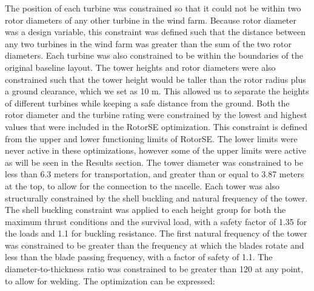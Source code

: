         The position of each turbine was constrained so that it could not be within two rotor diameters of any other turbine in the wind farm. Because rotor diameter was a design variable, this constraint was defined such that the distance between any two turbines in the wind farm was greater than the sum of the two rotor diameters.
        Each turbine was also constrained to be within the boundaries of the original baseline layout.
        The tower heights and rotor diameters were also constrained such that the tower height would be taller than the rotor radius plus a ground clearance, which we set as 10 m. This allowed us to separate the heights of different turbines while keeping a safe distance from the ground. 
        Both the rotor diameter and the turbine rating were constrained by the lowest and highest values that were included in the RotorSE optimization. This constraint is defined from the upper and lower functioning limits of RotorSE. The lower limits were never active in these optimizations, however some of the upper limits were active as will be seen in the Results section.
        The tower diameter was constrained to be less than 6.3 meters for transportation, and greater than or equal to 3.87 meters at the top, to allow for the connection to the nacelle. Each tower was also structurally constrained by the shell buckling and natural frequency of the tower. The shell buckling constraint was applied to each height group for both the maximum thrust conditions and the survival load, with a safety factor of 1.35 for the loads and 1.1 for buckling resistance. The first natural frequency of the tower was constrained to be greater than the frequency at which the blades rotate and less than the blade passing frequency, with a factor of safety of 1.1. The diameter-to-thickness ratio was constrained to be greater than 120 at any point, to allow for welding. The optimization can be expressed:
        

